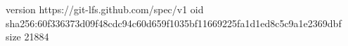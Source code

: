 version https://git-lfs.github.com/spec/v1
oid sha256:60f336373d09f48cdc94c60d659f1035bf11669225fa1d1ed8c5c9a1e2369dbf
size 21884
